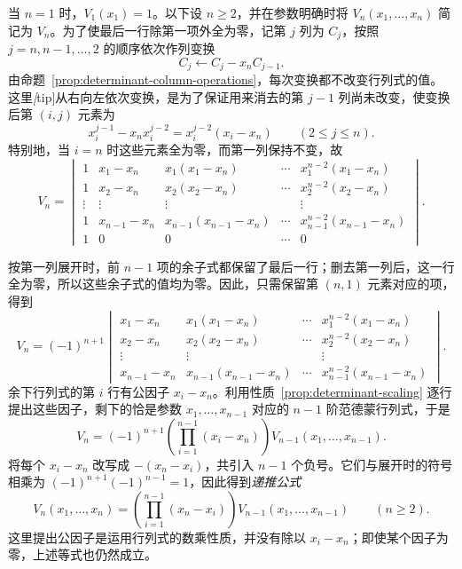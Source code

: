 \begin{solve}
当 $n=1$ 时，$V_1(x_1)=1$。以下设 $n\geq 2$，并在参数明确时将 $V_n(x_1,\ldots,x_n)$ 简记为 $V_n$。为了使最后一行除第一项外全为零，记第 $j$ 列为 $C_j$，按照 $j=n,n-1,\ldots,2$ 的顺序依次作列变换
\[
    C_j\longleftarrow C_j-x_nC_{j-1}.
\]
由命题~\ref{prop:determinant-column-operations}，每次变换都不改变行列式的值。这里\emph[tip]{从右向左依次变换}，是为了保证用来消去的第 $j-1$ 列尚未改变，使变换后第 $(i,j)$ 元素为
\[
    x_i^{j-1}-x_nx_i^{j-2}
    =x_i^{j-2}(x_i-x_n)\qquad(2\leq j\leq n).
\]
特别地，当 $i=n$ 时这些元素全为零，而第一列保持不变，故
\[
    V_n=
    \begin{vmatrix}
        1 & x_1-x_n & x_1(x_1-x_n) & \cdots & x_1^{n-2}(x_1-x_n) \\
        1 & x_2-x_n & x_2(x_2-x_n) & \cdots & x_2^{n-2}(x_2-x_n) \\
        \vdots & \vdots & \vdots & & \vdots \\
        1 & x_{n-1}-x_n & x_{n-1}(x_{n-1}-x_n) & \cdots & x_{n-1}^{n-2}(x_{n-1}-x_n) \\
        1 & 0 & 0 & \cdots & 0
    \end{vmatrix}.
\]

按第一列展开时，前 $n-1$ 项的余子式都保留了最后一行；删去第一列后，这一行全为零，所以这些余子式的值均为零。因此，只需保留第 $(n,1)$ 元素对应的项，得到
\[
    V_n=(-1)^{n+1}
    \begin{vmatrix}
        x_1-x_n & x_1(x_1-x_n) & \cdots & x_1^{n-2}(x_1-x_n) \\
        x_2-x_n & x_2(x_2-x_n) & \cdots & x_2^{n-2}(x_2-x_n) \\
        \vdots & \vdots & & \vdots \\
        x_{n-1}-x_n & x_{n-1}(x_{n-1}-x_n) & \cdots & x_{n-1}^{n-2}(x_{n-1}-x_n)
    \end{vmatrix}.
\]
余下行列式的第 $i$ 行有公因子 $x_i-x_n$。利用性质~\ref{prop:determinant-scaling} 逐行提出这些因子，剩下的恰是参数 $x_1,\ldots,x_{n-1}$ 对应的 $n-1$ 阶范德蒙行列式，于是
\[
    V_n=(-1)^{n+1}\left(\prod_{i=1}^{n-1}(x_i-x_n)\right)
        V_{n-1}(x_1,\ldots,x_{n-1}).
\]
将每个 $x_i-x_n$ 改写成 $-(x_n-x_i)$，共引入 $n-1$ 个负号。它们与展开时的符号相乘为 $(-1)^{n+1}(-1)^{n-1}=1$，因此得到\emph{递推公式}
\begin{equation}
\label{eq:vandermonde-recurrence}
    V_n(x_1,\ldots,x_n)
    =\left(\prod_{i=1}^{n-1}(x_n-x_i)\right)
        V_{n-1}(x_1,\ldots,x_{n-1})\qquad(n\geq 2).
\end{equation}
这里提出公因子是运用行列式的数乘性质，并没有除以 $x_i-x_n$；即使某个因子为零，上述等式也仍然成立。


\end{solve}

